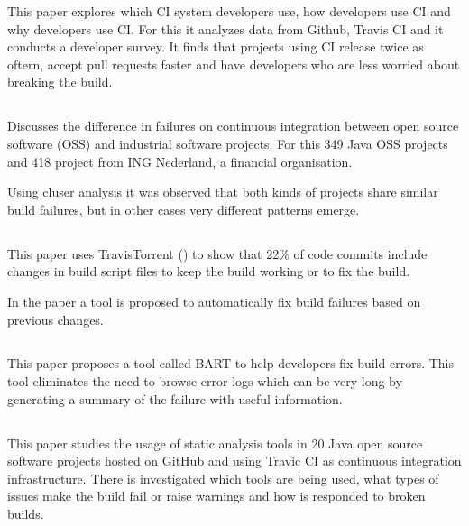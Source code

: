 \documentclass[]{book}
\begin{document}
This paper explores which CI system developers use, how developers use
CI and why developers use CI. For this it analyzes data from Github,
Travis CI and it conducts a developer survey. It finds that projects
using CI release twice as oftern, accept pull requests faster and have
developers who are less worried about breaking the build.

\subsection{\texorpdfstring{\citet{vassallo2017tale}}{@vassallo2017tale}}\label{vassallo2017tale}

Discusses the difference in failures on continuous integration between
open source software (OSS) and industrial software projects. For this
349 Java OSS projects and 418 project from ING Nederland, a financial
organisation.

Using cluser analysis it was observed that both kinds of projects share
similar build failures, but in other cases very different patterns
emerge.

\subsection{\texorpdfstring{\citet{hassan2018hirebuild}}{@hassan2018hirebuild}}\label{hassan2018hirebuild}

This paper uses TravisTorrent (\citet{beller2017travistorrent}) to show
that 22\% of code commits include changes in build script files to keep
the build working or to fix the build.

In the paper a tool is proposed to automatically fix build failures
based on previous changes.

\subsection{\texorpdfstring{\citet{vassallo2018break}}{@vassallo2018break}}\label{vassallo2018break}

This paper proposes a tool called \textsc{BART} to help developers fix
build errors. This tool eliminates the need to browse error logs which
can be very long by generating a summary of the failure with useful
information.

\subsection{\texorpdfstring{\citet{zampetti2017open}}{@zampetti2017open}}\label{zampetti2017open}

This paper studies the usage of static analysis tools in 20 Java open
source software projects hosted on GitHub and using Travic CI as
continuous integration infrastructure. There is investigated which tools
are being used, what types of issues make the build fail or raise
warnings and how is responded to broken builds.


\end{document}
